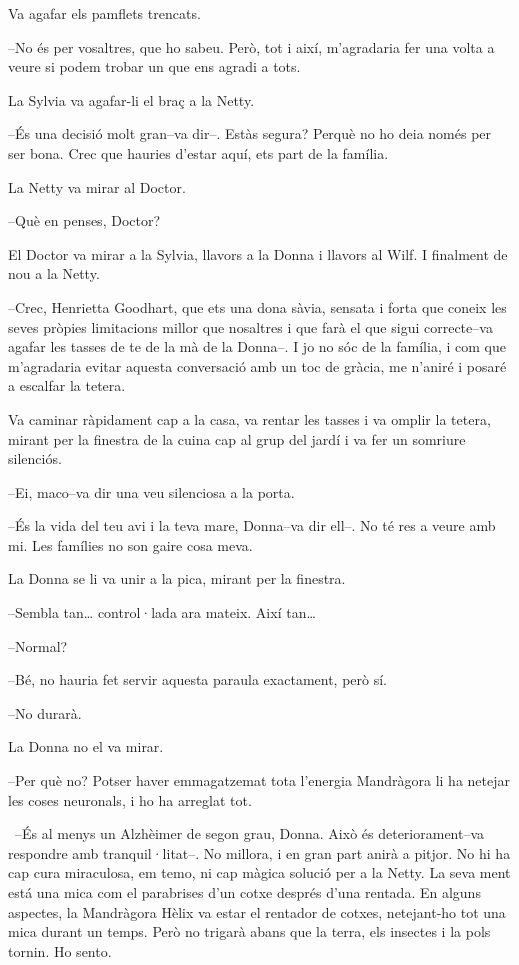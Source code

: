 Va agafar els pamflets trencats.

--No és per vosaltres, que ho sabeu. Però, tot i així, m'agradaria fer
una volta a veure si podem trobar un que ens agradi a tots.

La Sylvia va agafar-li el braç a la Netty.

--És una decisió molt gran--va dir--. Estàs segura? Perquè no ho deia
només per ser bona. Crec que hauries d'estar aquí, ets part de la
família.

La Netty va mirar al Doctor.

--Què en penses, Doctor?

El Doctor va mirar a la Sylvia, llavors a la Donna i llavors al Wilf. I
finalment de nou a la Netty.

--Crec, Henrietta Goodhart, que ets una dona sàvia, sensata i forta que
coneix les seves pròpies limitacions millor que nosaltres i que farà el
que sigui correcte--va agafar les tasses de te de la mà de la Donna--. I
jo no sóc de la família, i com que m'agradaria evitar aquesta
conversació amb un toc de gràcia, me n'aniré i posaré a escalfar la
tetera.

Va caminar ràpidament cap a la casa, va rentar les tasses i va omplir la
tetera, mirant per la finestra de la cuina cap al grup del jardí i va
fer un somriure silenciós.

--Ei, maco--va dir una veu silenciosa a la porta.

--És la vida del teu avi i la teva mare, Donna--va dir ell--. No té res
a veure amb mi. Les famílies no son gaire cosa meva.

La Donna se li va unir a la pica, mirant per la finestra.

--Sembla tan\ldots{} control·lada ara mateix. Així tan\ldots{}

--Normal?

--Bé, no hauria fet servir aquesta paraula exactament, però sí.

--No durarà.

La Donna no el va mirar.

--Per què no? Potser haver emmagatzemat tota l'energia Mandràgora li ha
netejar les coses neuronals, i ho ha arreglat tot.

~--És al menys un Alzhèimer de segon grau, Donna. Això és
deteriorament--va respondre amb tranquil·litat--. No millora, i en gran
part anirà a pitjor. No hi ha cap cura miraculosa, em temo, ni cap
màgica solució per a la Netty. La seva ment está una mica com el
parabrises d'un cotxe després d'una rentada. En alguns aspectes, la
Mandràgora Hèlix va estar el rentador de cotxes, netejant-ho tot una
mica durant un temps. Però no trigarà abans que la terra, els insectes i
la pols tornin. Ho sento.

